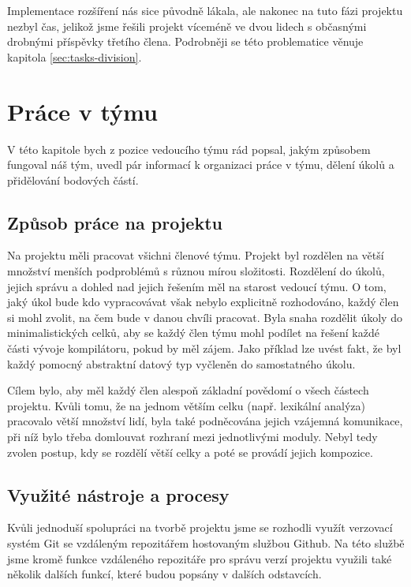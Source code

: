 \documentclass[11pt,a4paper]{article}
\begin{document}
    Implementace rozšíření nás sice původně lákala, ale nakonec na tuto fázi projektu nezbyl čas, jelikož jsme řešili projekt víceméně ve dvou lidech s občasnými drobnými příspěvky třetího člena. Podrobněji se této problematice věnuje kapitola \ref{sec:tasks-division}.
    
\section{Práce v týmu}
\label{sec:team-work}

V této kapitole bych z pozice vedoucího týmu rád popsal, jakým způsobem fungoval náš tým, uvedl pár informací k organizaci práce v týmu, dělení úkolů a přidělování bodových částí.

\subsection{Způsob práce na projektu}
\label{sec:way-to-work-on-project}

Na projektu měli pracovat všichni členové týmu. Projekt byl rozdělen na větší množství menších podproblémů s různou mírou složitosti. Rozdělení do úkolů, jejich správu a dohled nad jejich řešením měl na starost vedoucí týmu. O tom, jaký úkol bude kdo vypracovávat však nebylo explicitně rozhodováno, každý člen si mohl zvolit, na čem bude v danou chvíli pracovat. Byla snaha rozdělit úkoly do minimalistických celků, aby se každý člen týmu mohl podílet na řešení každé části vývoje kompilátoru, pokud by měl zájem. Jako příklad lze uvést fakt, že byl každý pomocný abstraktní datový typ vyčleněn do samostatného úkolu.

Cílem bylo, aby měl každý člen alespoň základní povědomí o všech částech projektu. Kvůli tomu, že na jednom větším celku (např. lexikální analýza) pracovalo větší množství lidí, byla také podněcována jejich vzájemná komunikace, při níž bylo třeba domlouvat rozhraní mezi jednotlivými moduly. Nebyl tedy zvolen postup, kdy se rozdělí větší celky a poté se provádí jejich kompozice.

\subsection{Využité nástroje a procesy}

Kvůli jednoduší spolupráci na tvorbě projektu jsme se rozhodli využít verzovací systém Git se vzdáleným repozitářem hostovaným službou Github. Na této službě jsme kromě funkce vzdáleného repozitáře pro správu verzí projektu využili také několik dalších funkcí, které budou popsány v dalších odstavcích.
\end{document}
